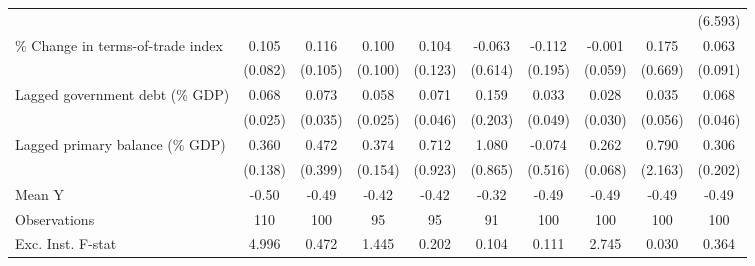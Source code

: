{\begin{tabular}{l*{9}{c}}
                    &                     &                     &                     &                     &                     &                     &                     &                     &     (6.593)         \\
\addlinespace
\% Change in terms-of-trade index&       0.105         &       0.116         &       0.100         &       0.104         &      -0.063         &      -0.112         &      -0.001         &       0.175         &       0.063         \\
                    &     (0.082)         &     (0.105)         &     (0.100)         &     (0.123)         &     (0.614)         &     (0.195)         &     (0.059)         &     (0.669)         &     (0.091)         \\
\addlinespace
Lagged government debt (\% GDP)&       0.068\sym{***}&       0.073\sym{**} &       0.058\sym{**} &       0.071         &       0.159         &       0.033         &       0.028         &       0.035         &       0.068         \\
                    &     (0.025)         &     (0.035)         &     (0.025)         &     (0.046)         &     (0.203)         &     (0.049)         &     (0.030)         &     (0.056)         &     (0.046)         \\
\addlinespace
Lagged primary balance (\% GDP)&       0.360\sym{***}&       0.472         &       0.374\sym{**} &       0.712         &       1.080         &      -0.074         &       0.262\sym{***}&       0.790         &       0.306         \\
                    &     (0.138)         &     (0.399)         &     (0.154)         &     (0.923)         &     (0.865)         &     (0.516)         &     (0.068)         &     (2.163)         &     (0.202)         \\
\midrule
Mean Y              &       -0.50         &       -0.49         &       -0.42         &       -0.42         &       -0.32         &       -0.49         &       -0.49         &       -0.49         &       -0.49         \\
Observations        &         110         &         100         &          95         &          95         &          91         &         100         &         100         &         100         &         100         \\
Exc. Inst. F-stat   &       4.996         &       0.472         &       1.445         &       0.202         &       0.104         &       0.111         &       2.745         &       0.030         &       0.364         \\
\bottomrule
\end{tabular}
}

